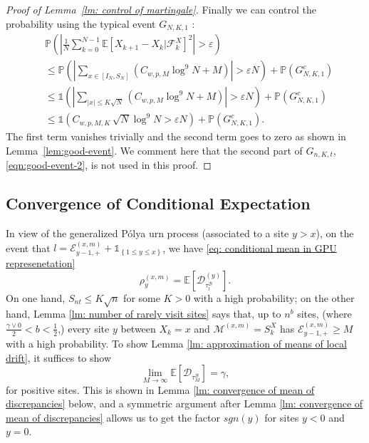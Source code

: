 \documentclass[twoside,12pt, a4paper]{article}
\numberwithin{equation}{section}
\theoremstyle{remark}
\newcommand{\comment}[1]{\textcolor{blue}{(Comment: #1)}}
\begin{document}
\begin{proof}[Proof of Lemma~\ref{lm: control of martingale}]
		Finally we can control the probability using the typical event $G_{N, K, 1}$ :
		\begin{align*}
			&\mathbb{P}\left( \left| \frac{1}{N} \sum_{k = 0}^{N-1} \mathbb{E}\left[ X_{k+1} - X_k | \mathcal{F}_k^X \right]^2  \right|  > \varepsilon \right)\\
			&\le \mathbb{P}\left( \left| \sum_{x \in \left[ I_N, S_N \right]} (C_{w, p, M} \log^9 N +M ) \right| > \varepsilon  N \right) + \mathbb{P}\left( G_{N, K, 1}^c \right)  \\
			&\le \mathbb{1}\left(  \left| \sum_{|x| \le K \sqrt{N} } (C_{w, p, M} \log^9 N +M ) \right| > \varepsilon  N  \right) + \mathbb{P}\left( G_{N, K, 1}^c \right)  \\
			&\le \mathbb{1}\left(  C_{w, p, M, K} \, \sqrt{N} \log^9 N > \varepsilon  N  \right) + \mathbb{P}\left( G_{N, K, 1}^c \right) 
			.\end{align*}
		The first term vanishes trivially and the second term goes to zero as shown in Lemma~\ref{lem:good-event}. 
		We comment here that the second part of $G_{n, K, t}$, \eqref{eqn:good-event-2}, is not used in this proof.
	\end{proof}
	
	
	
	\subsection{Convergence of Conditional Expectation}
	\label{sec:RhoGamma}
	In view of the generalized P\'{o}lya urn process (associated to a site $y> x$), 
	on the event that $l = \mathcal{E}^{(x,m)}_{y-1,+} +\mathbb{1}_{\left\{1\leq y\leq x\right\}}$, we have \eqref{eq: conditional mean in GPU represenetation} 
	$$\rho^{(x,m)}_y = \mathbb{E}\left[\mathcal{D}_{\tau_l^{\mathcal{B}}}^{(y)}\right].$$ 
	On one hand, $S_{nt} \leq K\sqrt{n} $ for some $K>0$ with a high probability; on the other hand, Lemma \ref{lm: number of rarely visit sites} says that, up to $n^b$ sites, (where $\frac{\gamma \vee 0}{2}<b<\frac{1}{2}$,) every site $y$ between $X_k=x$ and $\mathcal{M}^{(x,m)} =S_{k}^X$ has $ \mathcal{E}^{(x,m)}_{y-1,+} \geq M $ with a high probability. To show Lemma \ref{lm: approximation of means of local drift}, it suffices to show 
	\begin{equation}\label{eq: convergence of conditional expectation}
		\lim_{M\to\infty} \mathbb{E}[\mathcal{D}_{\tau_M^{\mathcal{B}}}] = \gamma , 
	\end{equation} for positive sites. This is shown in Lemma \ref{lm: convergence of mean of discrepancies} below, and a symmetric argument after Lemma \ref{lm: convergence of mean of discrepancies} allows us to get the factor $sgn(y)$ for sites $y<0$ and $y=0$.
	
\end{document}
